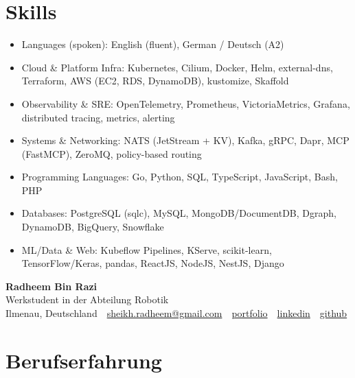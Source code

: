 \documentclass[10pt,a4paper]{resume}
\makeatletter
\newcommand{\Portfolio}{https://radheem.github.io/my-cv}
\newcommand{\PortfolioText}{portfolio}
\newcommand{\GitHub}{https://github.com/radheem}
\newcommand{\LinkedIn}{https://www.linkedin.com/in/radheem-razi}
\newcommand{\Email}{sheikh.radheem@gmail.com}
\makeatother
\begin{document}
\section{Skills}

\begin{itemize}[leftmargin=1.4em,nosep,topsep=2pt]
  \item Languages (spoken): English (fluent), German / Deutsch (A2)
  \item Cloud \& Platform Infra: Kubernetes, Cilium, Docker, Helm, external-dns, Terraform, AWS (EC2, RDS, DynamoDB), kustomize, Skaffold
  \item Observability \& SRE: OpenTelemetry, Prometheus, VictoriaMetrics, Grafana, distributed tracing, metrics, alerting
  \item Systems \& Networking: NATS (JetStream + KV), Kafka, gRPC, Dapr, MCP (FastMCP), ZeroMQ, policy-based routing
  \item Programming Languages: Go, Python, SQL, TypeScript, JavaScript, Bash, PHP
  \item Databases: PostgreSQL (sqlc), MySQL, MongoDB/DocumentDB, Dgraph, DynamoDB, BigQuery, Snowflake
  \item ML/Data \& Web: Kubeflow Pipelines, KServe, scikit-learn, TensorFlow/Keras, pandas, ReactJS, NodeJS, NestJS, Django
\end{itemize}

\clearpage
{}

\begin{center}
  {\huge\bfseries Radheem Bin Razi}\\[3pt]
  {\large Werkstudent in der Abteilung Robotik}\\[6pt]
  \small
  Ilmenau, Deutschland \,\textbar\,
  \href{mailto:\Email}{\Email} \,\textbar\,
  \href{\Portfolio}{\PortfolioText} \,\textbar\,
  \href{\LinkedIn}{linkedin} \,\textbar\,
  \href{\GitHub}{github}
\end{center}
\vspace{2pt}

\section{Berufserfahrung}
\end{document}
